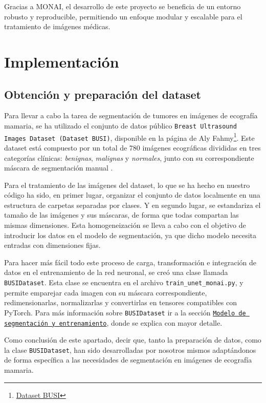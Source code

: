 \documentclass[12pt]{article}
\begin{document}
Gracias a MONAI, el desarrollo de este proyecto se beneficia de un entorno robusto y reproducible, permitiendo un enfoque modular y escalable para el tratamiento de imágenes médicas.



\section{Implementación}
\subsection{Obtención y preparación del dataset}

Para llevar a cabo la tarea de segmentación de tumores en imágenes de ecografía mamaria, se ha utilizado el conjunto de datos público \texttt{Breast Ultrasound Images Dataset (Dataset BUSI)}, disponible en la página de Aly Fahmy\footnote{\href{https://scholar.cu.edu.eg/?q=afahmy/pages/dataset}{Dataset BUSI}}. Este dataset está compuesto por un total de 780 imágenes ecográficas divididas en tres categorías clínicas: \textit{benignas}, \textit{malignas} y \textit{normales}, junto con su correspondiente máscara de segmentación manual \cite{al2020dataset}.

Para el tratamiento de las imágenes del dataset, lo que se ha hecho en nuestro código ha sido, en primer lugar, organizar el conjunto de datos localmente en una estructura de carpetas separadas por clases. Y en segundo lugar, se estandariza el tamaño de las imágenes y sus máscaras, de forma que todas compartan las mismas dimensiones. Esta homogeneización se lleva a cabo con el objetivo de introducir los datos en el modelo de segmentación, ya que dicho modelo necesita entradas con dimensiones fijas.

Para hacer más fácil todo este proceso de carga, transformación e integración de datos en el entrenamiento de la red neuronal, se creó una clase llamada \texttt{BUSIDataset}. Esta clase se encuentra en el archivo \texttt{train\_unet\_monai.py}, y permite emparejar cada imagen con su máscara correspondiente, redimensionarlas, normalizarlas y convertirlas en tensores compatibles con PyTorch. Para más información sobre \texttt{BUSIDataset} ir a la sección \hyperref[sec:entrenamiento]{\texttt{Modelo de segmentación y entrenamiento}}, donde se explica con mayor detalle.

Como conclusión de este apartado, decir que, tanto la preparación de datos, como la clase \texttt{BUSIDataset}, han sido desarrolladas por nosotros mismos adaptándonos de forma específica a las necesidades de segmentación en imágenes de ecografía mamaria.
\end{document}
